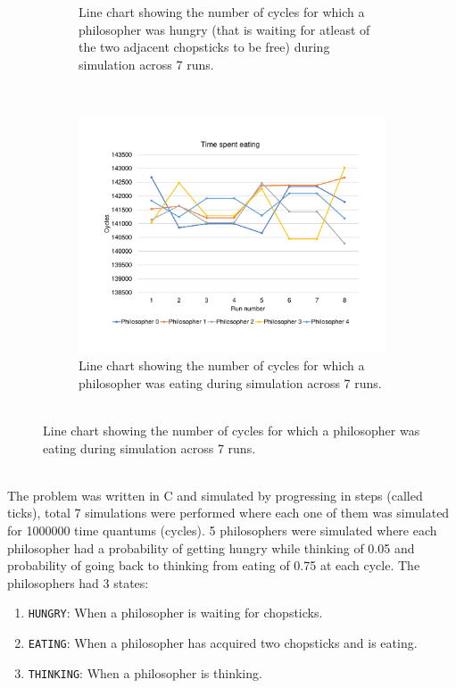 \documentclass[a4,11pt]{article}
\begin{document}
\begin{figure}[!ht]
\begin{subfigure}[b]{0.3\textwidth}
    \caption{\sffamily Line chart showing the number of cycles for
      which a philosopher was hungry (that is waiting for atleast of
      the two adjacent chopsticks to be free) during simulation across
      7 runs.}
    \label{fig:thinking-chart}
  \end{subfigure}
  ~
  \begin{subfigure}[b]{0.3\textwidth}
    \includegraphics[width=\textwidth]{./resources/time-eating.pdf}
    \caption{\sffamily Line chart showing the number of cycles for
      which a philosopher was eating during simulation across 7
      runs.\\\\}
    \label{fig:time-eating}
  \end{subfigure}
\end{figure}


The problem was written in C and simulated by progressing in steps
(called ticks), total 7 simulations were performed where each one of
them was simulated for 1000000 time quantums (cycles). 5 philosophers
were simulated where each philosopher had a probability of getting
hungry while thinking of 0.05 and probability of going back to
thinking from eating of 0.75 at each cycle. The philosophers had 3
states:

\begin{enumerate}
\item \texttt{HUNGRY}: When a philosopher is waiting for chopsticks.
\item \texttt{EATING}: When a philosopher has acquired two chopsticks
  and is eating.
\item \texttt{THINKING}: When a philosopher is thinking.
\end{enumerate}
\end{document}
